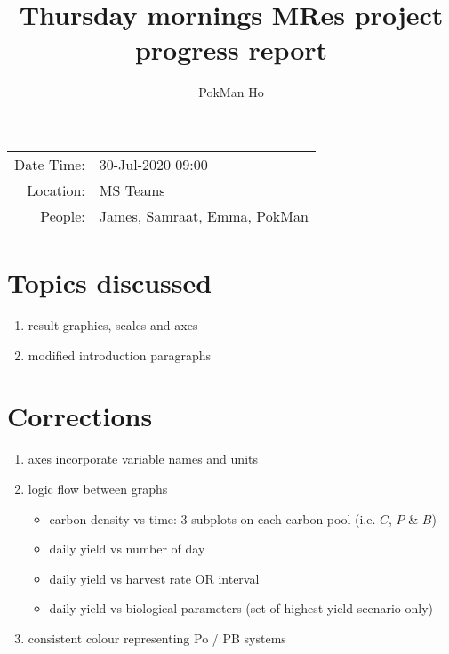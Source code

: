 \documentclass[a4paper,11pt]{article}
\title{Thursday mornings MRes project progress report}
\author{PokMan Ho}
\date{}
\begin{document}
    \maketitle
    
    \begin{tabular}{rl}
        Date Time: & 30-Jul-2020 09:00 \\
        Location: & MS Teams \\
        People: & James, Samraat, Emma, PokMan \\
    \end{tabular}
    
    \section{Topics discussed}
    \begin{enumerate}
        \item result graphics, scales and axes
        \item modified introduction paragraphs
    \end{enumerate}
    
    \section{Corrections}
    \begin{enumerate}
        \item axes incorporate variable names and units
        \item logic flow between graphs
        \begin{itemize}
            \item carbon density vs time: 3 subplots on each carbon pool (i.e. $C$, $P$ \& $B$)
            \item daily yield vs number of day
            \item daily yield vs harvest rate OR interval
            \item daily yield vs biological parameters (set of highest yield scenario only)
        \end{itemize}
        \item consistent colour representing Po / PB systems
    \end{enumerate}
    
\end{document}
